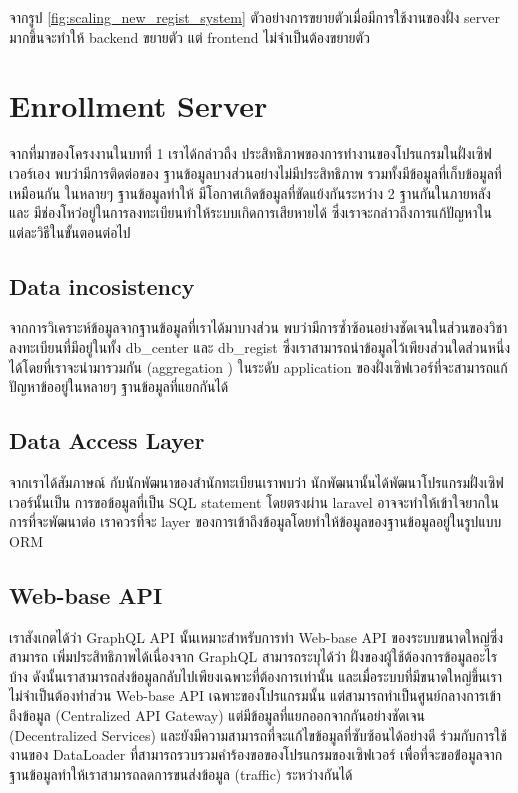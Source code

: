 จากรูป \ref{fig:scaling_new_regist_system} ตัวอย่างการขยายตัวเมื่อมีการใช้งานของฝั่ง server มากขึ้นจะทำให้ backend ขยายตัว แต่ frontend ไม่จำเป็นต้องขยายตัว

\section{Enrollment Server}

จากที่มาของโครงงานในบทที่ 1 เราได้กล่าวถืง ประสิทธิภาพของการทำงานของโปรแกรมในฝั่งเซิฟเวอร์เอง พบว่ามีการติดต่อของ ฐานข้อมูลบางส่วนอย่างไม่มีประสิทธิภาพ รวมทั้งมีข้อมูลที่เก็บข้อมูลที่เหมือนกัน ในหลายๆ ฐานข้อมูลทำให้ มีโอกาศเกิดข้อมูลที่ขัดแย้งกันระหว่าง 2 ฐานกันในภายหลัง และ มีช่องโหว่อยู่ในการลงทะเบียนทำให้ระบบเกิดการเสียหายได้ ซึ่งเราจะกล่าวถึงการแก้ปัญหาในแต่ละวิธีในขั้นตอนต่อไป

\subsection{Data incosistency}

จากการวิเคราะห์ข้อมูลจากฐานข้อมูลที่เราได้มาบางส่วน พบว่ามีการซ้ำซ้อนอย่างชัดเจนในส่วนของวิชาลงทะเบียนที่มีอยู่ในทั้ง db\_center และ db\_regist ซึ่งเราสามารถนำข้อมูลไว้เพียงส่วนใดส่วนหนึ่งได้โดยที่เราจะนำมารวมกัน (aggregation \cite{aggregation}) ในระดับ application ของฝั่งเซิฟเวอร์ที่จะสามารถแก้ปัญหาข้ออยู่ในหลายๆ ฐานข้อมูลที่แยกกันได้

\subsection{Data Access Layer}

จากเราได้สัมภาษณ์ กับนักพัฒนาของสำนักทะเบียนเราพบว่า นักพัฒนานั้นได้พัฒนาโปรแกรมฝั่งเซิฟเวอร์นั้นเป็น การขอข้อมูลที่เป็น SQL statement โดยตรงผ่าน laravel อาจจะทำให้เข้าใจยากในการที่จะพัฒนาต่อ เราควรที่จะ layer ของการเข้าถึงข้อมูลโดยทำให้ข้อมูลของฐานข้อมูลอยู่ในรูปแบบ ORM \cite{orm}

\subsection{Web-base API}

เราสังเกตได้ว่า GraphQL API \cite{graphql} นั้นเหมาะสำหรับการทำ Web-base API ของระบบขนาดใหญ่ซึ่งสามารถ เพิ่มประสิทธิภาพได้เนื่องจาก GraphQL สามารถระบุได้ว่า ฝั่งของผู้ใช้ต้องการข้อมูลอะไรบ้าง ดังนั้นเราสามารถส่งข้อมูลกลับไปเพียงเฉพาะที่ต้องการเท่านั้น และเมื่อระบบที่มีขนาดใหญ่ขึ้นเรา ไม่จำเป็นต้องทำส่วน Web-base API เฉพาะของโปรแกรมนั้น แต่สามารถทำเป็นศูนย์กลางการเข้าถึงข้อมูล (Centralized API Gateway) แต่มีข้อมูลที่แยกออกจากกันอย่างชัดเจน (Decentralized Services) และยังมีความสามารถที่จะแก้ไขข้อมูลที่ซับซ้อนได้อย่างดี \cite{graphqlexec} ร่วมกับการใช้งานของ DataLoader ที่สามารถรวบรวมคำร้องขอของโปรแกรมของเซิฟเวอร์ เพื่อที่จะขอข้่อมูลจากฐานข้อมูลทำให้เราสามารถลดการขนส่งข้อมูล (traffic) ระหว่างกันได้


